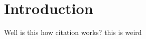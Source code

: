 \documentclass[12pt]{article}
\begin{document}
\section*{Introduction}

Well is this how citation works?\cite{Minna2021}
this is weird \cite{Stahl2018}




\end{document}
